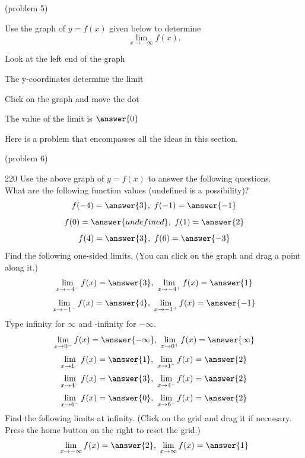 \documentclass[handout]{ximera}
\begin{document}
\begin{problem}(problem 5)

  Use the graph of $y = f(x)$ given below to determine
  \[
  \lim_{x\to -\infty} f(x).
  \]
  
    \begin{hint}
      Look at the left end of the graph
    \end{hint}
    \begin{hint}
      The y-coordinates determine the limit
    \end{hint}
		\begin{hint}
		  Click on the graph and move the dot
		\end{hint}
		The value of the limit is
		 $\answer{0}$

	
\end{problem}

Here is a problem that encompasses all the ideas in this section.

\begin{problem}(problem 6)
	\begin{leash}{220}
	Use the above graph of $y = f(x)$ to answer the following questions.\\
	
  
  What are the following function values (undefined is a possibility)?  
		 \[f(-4) = \answer{3}, \ f(-1) = \answer{-1} \]
		 \[f(0) = \answer{undefined}, \ f(1) = \answer{2} \]
	   \[f(4) = \answer{3}, \ f(6) = \answer{-3} \]
	Find the following one-sided limits. (You can click on the graph and drag a point along it.)
	\[\lim_{x\to -4^-} f(x) = \answer{3}, \ \lim_{x\to -4^+} f(x) = \answer{1}\]
	\[\lim_{x\to -1^-} f(x) = \answer{4}, \ \lim_{x\to -1^+} f(x) = \answer{-1}\]
	Type infinity for $\infty$ and -infinity for $-\infty$.
	\[\lim_{x\to 0^-} f(x) = \answer{-\infty}, \ \lim_{x\to 0^+} f(x) = \answer{\infty}\]
	\[\lim_{x\to 1^-} f(x) = \answer{1}, \ \lim_{x\to 1^+} f(x) = \answer{2}\]
	\[\lim_{x\to 4^-} f(x) = \answer{3}, \ \lim_{x\to 4^+} f(x) = \answer{2}\]
	\[\lim_{x\to 6^-} f(x) = \answer{0}, \ \lim_{x\to 6^+} f(x) = \answer{2}\]
	Find the following limits at infinity. (Click on the grid and drag it if necessary.  
	Press the home button on the right to reset the grid.)
	\[\lim_{x\to -\infty} f(x) = \answer{2}, \ \lim_{x\to \infty} f(x) = \answer{1}\]
	
	\end{leash}
\end{problem}
\end{document}
